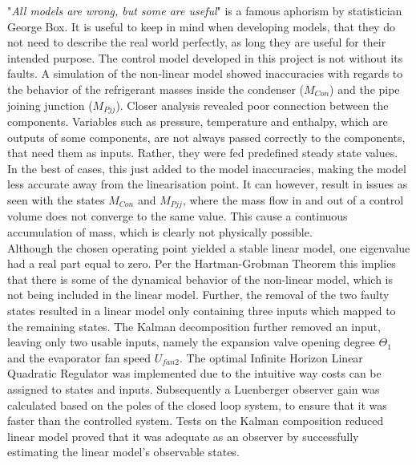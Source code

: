 "\textit{All models are wrong, but some are useful}" is a famous aphorism by statistician George Box. It is useful to keep in mind when developing models, that they do not need to describe the real world perfectly, as long they are useful for their intended purpose. The control model developed in this project is not without its faults. A simulation of the non-linear model showed inaccuracies with regards to the behavior of the refrigerant masses inside the condenser ($M_{Con}$) and the pipe joining junction ($M_{Pjj}$). Closer analysis revealed poor connection between the components. Variables such as pressure, temperature and enthalpy, which are outputs of some components, are not always passed correctly to the components, that need them as inputs. Rather, they were fed predefined steady state values. In the best of cases, this just added to the model inaccuracies, making the model less accurate away from the linearisation point. It can however, result in issues as seen with the states $M_{Con}$ and $M_{Pjj}$, where the mass flow in and out of a control volume does not converge to the same value. This cause a continuous accumulation of mass, which is clearly not physically possible. \\

Although the chosen operating point yielded a stable linear model, one eigenvalue had a real part equal to zero. Per the Hartman-Grobman Theorem this implies that there is some of the dynamical behavior of the non-linear model, which is not being included in the linear model. Further, the removal of the two faulty states resulted in a linear model only containing three inputs which mapped to the remaining states. The Kalman decomposition further removed an input, leaving only two usable inputs, namely the expansion valve opening degree $\Theta_1$ and the evaporator fan speed $U_{fan2}$. The optimal Infinite Horizon Linear Quadratic Regulator was implemented due to the intuitive way costs can be assigned to states and inputs. Subsequently a Luenberger observer gain was calculated based on the poles of the closed loop system, to ensure that it was faster than the controlled system. Tests on the Kalman composition reduced linear model proved that it was adequate as an observer by successfully estimating the linear model's observable states.\\

